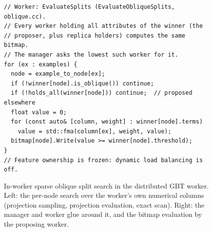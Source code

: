 \begin{figure}[t]
\begin{minipage}[t]{0.46\textwidth}
\begin{lstlisting}
// Worker: EvaluateSplits (EvaluateObliqueSplits, oblique.cc).
// Every worker holding all attributes of the winner (the
// proposer, plus replica holders) computes the same bitmap.
// The manager asks the lowest such worker for it.
for (ex : examples) {
  node = example_to_node[ex];
  if (!winner[node].is_oblique()) continue;
  if (!holds_all(winner[node])) continue;  // proposed elsewhere
  float value = 0;
  for (const auto& [column, weight] : winner[node].terms)
    value = std::fma(column[ex], weight, value);
  bitmap[node].Write(value >= winner[node].threshold);
}
// Feature ownership is frozen: dynamic load balancing is off.
\end{lstlisting}
\end{minipage}
\caption{In-worker sparse oblique split search in the distributed GBT worker. Left: the per-node search over the worker's own numerical columns (projection sampling, projection evaluation, exact scan). Right: the manager and worker glue around it, and the bitmap evaluation by the proposing worker.}
\label{lst:in_worker_oblique}
\end{figure}
